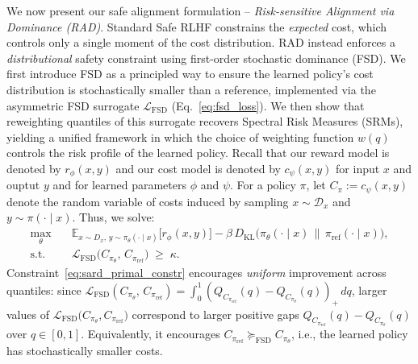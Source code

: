 

We now present our safe alignment formulation -- \emph{Risk-sensitive Alignment via Dominance  (RAD)}. Standard Safe RLHF constrains the \emph{expected} cost, which controls only a single moment of the cost distribution.
RAD instead enforces a \emph{distributional} safety constraint using first-order stochastic dominance (FSD). We first introduce FSD as a principled way to ensure the learned policy's cost distribution is
stochastically smaller than a reference,
implemented via the asymmetric FSD surrogate $\mathcal{L}_{\mathrm{FSD}}$ (Eq.~\eqref{eq:fsd_loss}). We then show that reweighting quantiles of this surrogate recovers
Spectral Risk Measures (SRMs), yielding a unified framework in which the choice of weighting function $w(q)$ controls the risk profile of the learned policy.
Recall that our reward model is denoted by $r_{\phi}(x,y)$ and our cost model is denoted by $c_{\psi}(x,y)$ for input $x$ and ouptut $y$ and for learned parameters $\phi$ and $\psi$. For a policy $\pi$, let $C_\pi := c_\psi(x,y)$ denote the random variable of costs induced by sampling
$x\sim\mathcal{D}_x$ and $y\sim\pi(\cdot\mid x)$. Thus, we solve:
\begin{align}
  \max_\theta \quad & \mathbb{E}_{x\sim D_x,\,y\sim\pi_\theta(\cdot\mid x)}\!\Big[r_\phi(x,y)\Big]
  - \beta\,D_{\mathrm{KL}}\!\big(\pi_\theta(\cdot\mid x)\,\|\,\pi_{\mathrm{ref}}(\cdot\mid x)\big), \label{eq:sard_primal_obj}\\
  \text{s.t.}\quad & \mathcal{L}_{\mathrm{FSD}}\!\big(C_{\pi_\theta},\,C_{\pi_{\mathrm{ref}}}\big)\;\ge\;\kappa. \label{eq:sard_primal_constr}
\end{align}
Constraint~\eqref{eq:sard_primal_constr} encourages \emph{uniform} improvement across quantiles: since
$\mathcal{L}_{\mathrm{FSD}}(C_{\pi_\theta},\,C_{\pi_{\mathrm{ref}}})=\int_0^1 (Q_{C_{\pi_{\mathrm{ref}}}}(q)-Q_{C_{\pi_\theta}}(q))_+\,dq$,
larger values of $\mathcal{L}_{\mathrm{FSD}}\!\big(C_{\pi_\theta},C_{\pi_{\mathrm{ref}}}\big)$ correspond to larger positive gaps $Q_{C_{\pi_{\mathrm{ref}}}}(q)-Q_{C_{\pi_\theta}}(q)$ over $q\in[0,1]$.
Equivalently, it encourages $C_{\pi_{\mathrm{ref}}}\succeq_{\mathrm{FSD}} C_{\pi_\theta}$, i.e., the learned policy has stochastically smaller costs. %

